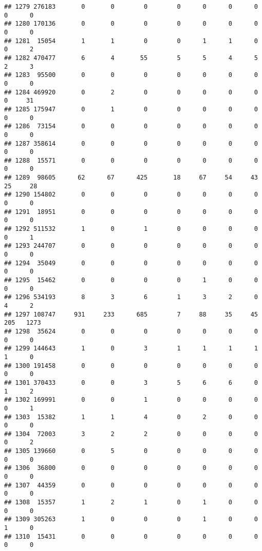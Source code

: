 \documentclass[
]{article}
\begin{document}
\begin{verbatim}
## 1279 276183       0       0        0        0      0      0      0     0      0
## 1280 170136       0       0        0        0      0      0      0     0      0
## 1281  15054       1       1        0        0      1      1      0     0      2
## 1282 470477       6       4       55        5      5      4      5     2      3
## 1283  95500       0       0        0        0      0      0      0     0      0
## 1284 469920       0       2        0        0      0      0      0     0     31
## 1285 175947       0       1        0        0      0      0      0     0      0
## 1286  73154       0       0        0        0      0      0      0     0      0
## 1287 358614       0       0        0        0      0      0      0     0      0
## 1288  15571       0       0        0        0      0      0      0     0      0
## 1289  98605      62      67      425       18     67     54     43    25     28
## 1290 154802       0       0        0        0      0      0      0     0      0
## 1291  18951       0       0        0        0      0      0      0     0      0
## 1292 511532       1       0        1        0      0      0      0     0      1
## 1293 244707       0       0        0        0      0      0      0     0      0
## 1294  35049       0       0        0        0      0      0      0     0      0
## 1295  15462       0       0        0        0      1      0      0     0      0
## 1296 534193       8       3        6        1      3      2      0     4      2
## 1297 108747     931     233      685        7     88     35     45   205   1273
## 1298  35624       0       0        0        0      0      0      0     0      0
## 1299 144643       1       0        3        1      1      1      1     1      0
## 1300 191458       0       0        0        0      0      0      0     0      0
## 1301 370433       0       0        3        5      6      6      0     1      2
## 1302 169991       0       0        1        0      0      0      0     0      1
## 1303  15382       1       1        4        0      2      0      0     0      0
## 1304  72003       3       2        2        0      0      0      0     0      2
## 1305 139660       0       5        0        0      0      0      0     0      0
## 1306  36800       0       0        0        0      0      0      0     0      0
## 1307  44359       0       0        0        0      0      0      0     0      0
## 1308  15357       1       2        1        0      1      0      0     0      0
## 1309 305263       1       0        0        0      1      0      0     1      0
## 1310  15431       0       0        0        0      0      0      0     0      0

\end{verbatim}
\end{document}

